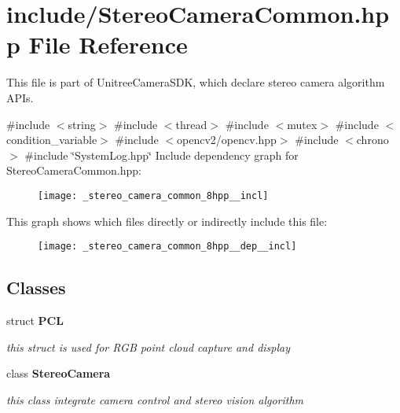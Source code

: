 \section{include/\+Stereo\+Camera\+Common.hpp File Reference}
\label{_stereo_camera_common_8hpp}


This file is part of Unitree\+Camera\+S\+DK, which declare stereo camera algorithm A\+P\+Is.  


{\ttfamily \#include $<$string$>$}\newline
{\ttfamily \#include $<$thread$>$}\newline
{\ttfamily \#include $<$mutex$>$}\newline
{\ttfamily \#include $<$condition\+\_\+variable$>$}\newline
{\ttfamily \#include $<$opencv2/opencv.\+hpp$>$}\newline
{\ttfamily \#include $<$chrono$>$}\newline
{\ttfamily \#include \char`\"{}System\+Log.\+hpp\char`\"{}}\newline
Include dependency graph for Stereo\+Camera\+Common.\+hpp\+:\nopagebreak
\begin{figure}[H]
\begin{center}
\leavevmode
\texttt{[image: \_stereo\_camera\_common\_8hpp\_\_incl]}
\end{center}
\end{figure}
This graph shows which files directly or indirectly include this file\+:\nopagebreak
\begin{figure}[H]
\begin{center}
\leavevmode
\texttt{[image: \_stereo\_camera\_common\_8hpp\_\_dep\_\_incl]}
\end{center}
\end{figure}
\subsection*{Classes}
\begin{DoxyCompactItemize}
\item 
struct \textbf{ P\+CL}
\begin{DoxyCompactList}\small\item\em this struct is used for R\+GB point cloud capture and display \end{DoxyCompactList}\item 
class \textbf{ Stereo\+Camera}
\begin{DoxyCompactList}\small\item\em this class integrate camera control and stereo vision algorithm \end{DoxyCompactList}\end{DoxyCompactItemize}
